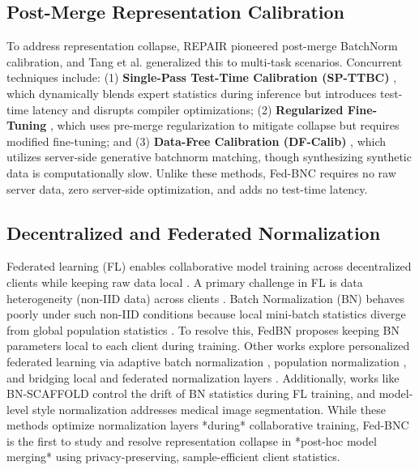 \documentclass{article}
\theoremstyle{plain}
\theoremstyle{definition}
\theoremstyle{remark}
\begin{document}
\subsection{Post-Merge Representation Calibration}
To address representation collapse, REPAIR \cite{jordan2023repair} pioneered post-merge BatchNorm calibration, and Tang et al. \cite{tang2024post} generalized this to multi-task scenarios. Concurrent techniques include: (1) \textbf{Single-Pass Test-Time Calibration (SP-TTBC)} \cite{submission5}, which dynamically blends expert statistics during inference but introduces test-time latency and disrupts compiler optimizations; (2) \textbf{Regularized Fine-Tuning} \cite{submission6}, which uses pre-merge regularization to mitigate collapse but requires modified fine-tuning; and (3) \textbf{Data-Free Calibration (DF-Calib)} \cite{submission10}, which utilizes server-side generative batchnorm matching, though synthesizing synthetic data is computationally slow. Unlike these methods, Fed-BNC requires no raw server data, zero server-side optimization, and adds no test-time latency.

\subsection{Decentralized and Federated Normalization}
Federated learning (FL) enables collaborative model training across decentralized clients while keeping raw data local \cite{mcmahan2017communication, kairouz2021advances}. A primary challenge in FL is data heterogeneity (non-IID data) across clients \cite{zhao2018federated, li2020federated, wang2020tackling}. Batch Normalization (BN) behaves poorly under such non-IID conditions because local mini-batch statistics diverge from global population statistics \cite{Guerraoui2024OvercomingTC, Quintana2024BNSCAFFOLDCT}. To resolve this, FedBN \cite{Li2021FedBNFL} proposes keeping BN parameters local to each client during training. Other works explore personalized federated learning via adaptive batch normalization \cite{Lu2021PersonalizedFL, Chen2021FederatedLW}, population normalization \cite{Wang2025PopulationNF}, and bridging local and federated normalization layers \cite{Cosgun2025BridgingLA}. Additionally, works like BN-SCAFFOLD \cite{Quintana2024BNSCAFFOLDCT} control the drift of BN statistics during FL training, and model-level style normalization \cite{Zhu2024ModellevelAA} addresses medical image segmentation. While these methods optimize normalization layers *during* collaborative training, Fed-BNC is the first to study and resolve representation collapse in *post-hoc model merging* using privacy-preserving, sample-efficient client statistics.
\end{document}

